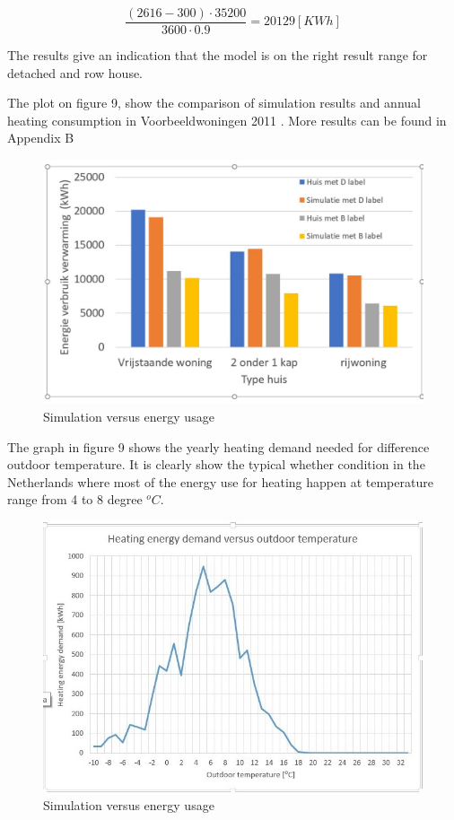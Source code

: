 \begin{equation}
\frac{(2616-300) \cdot 35200}{3600\cdot 0.9}= 20129[KWh] 
\end{equation}

The results give an indication that the model is on the right result range for detached and row house.

The plot on figure 9, show the comparison of simulation results and annual heating consumption in Voorbeeldwoningen 2011 \cite{VOORBEELD}. More results can be found in Appendix B

\begin{figure}[H]
	\centering
	\includegraphics[width=1.0\columnwidth]{Pictures/Simulation results.jpg}
	\caption[Short title]{Simulation versus energy usage}
	\label{fig:Simulationresults}
	\end{figure}
\newpage

The graph in figure 9 shows the yearly heating demand needed for difference outdoor temperature.
It is clearly show the typical whether condition in the Netherlands where most of the energy use for heating happen at temperature range from 4 to 8 degree $^oC$.

\begin{figure}[H]
	\centering
	\includegraphics[width=1.0\columnwidth]{Pictures/Yearheatingdemand.jpg}
	\caption[Short title]{Simulation versus energy usage}
	\label{fig:heatingvstemp}
	\end{figure}
	
